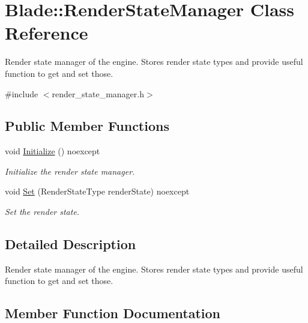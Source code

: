 \hypertarget{class_blade_1_1_render_state_manager}{}\section{Blade\+:\+:Render\+State\+Manager Class Reference}
\label{class_blade_1_1_render_state_manager}


Render state manager of the engine. Stores render state types and provide useful function to get and set those.  




{\ttfamily \#include $<$render\+\_\+state\+\_\+manager.\+h$>$}

\subsection*{Public Member Functions}
\begin{DoxyCompactItemize}
\item 
\mbox{\label{class_blade_1_1_render_state_manager_a0b26e9c469b8ec7289bb107effc95a8b}} 
void \hyperlink{class_blade_1_1_render_state_manager_a0b26e9c469b8ec7289bb107effc95a8b}{Initialize} () noexcept
\begin{DoxyCompactList}\small\item\em Initialize the render state manager. \end{DoxyCompactList}\item 
void \hyperlink{class_blade_1_1_render_state_manager_a3d2ef6c7f65efe5dc738db1f66650f0f}{Set} (Render\+State\+Type render\+State) noexcept
\begin{DoxyCompactList}\small\item\em Set the render state. \end{DoxyCompactList}\end{DoxyCompactItemize}


\subsection{Detailed Description}
Render state manager of the engine. Stores render state types and provide useful function to get and set those. 

\subsection{Member Function Documentation}
\mbox{\label{class_blade_1_1_render_state_manager_a3d2ef6c7f65efe5dc738db1f66650f0f}} 
